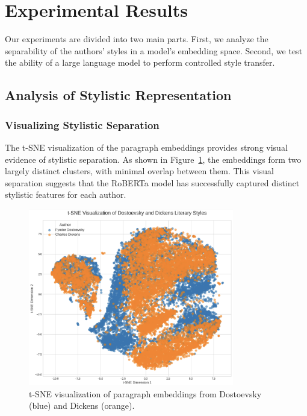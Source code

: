 \documentclass[sn-mathphys]{sn-jnl}%
\begin{document}
\section{Experimental Results}\label{sec3}

Our experiments are divided into two main parts. First, we analyze the separability of the authors' styles in a model's embedding space. Second, we test the ability of a large language model to perform controlled style transfer.

\subsection{Analysis of Stylistic Representation}\label{subsec3.1}

\subsubsection{Visualizing Stylistic Separation}\label{subsubsec3.1.1}
The t-SNE visualization of the paragraph embeddings provides strong visual evidence of stylistic separation. As shown in Figure~\ref{fig:tsne}, the embeddings form two largely distinct clusters, with minimal overlap between them. This visual separation suggests that the RoBERTa model has successfully captured distinct stylistic features for each author.

\begin{figure}[h]
    \centering
    \includegraphics[width=0.8\textwidth]{t-SNE Visualisation.png} %
    \caption{t-SNE visualization of paragraph embeddings from Dostoevsky (blue) and Dickens (orange).}\label{fig:tsne}
\end{figure}
\end{document}
